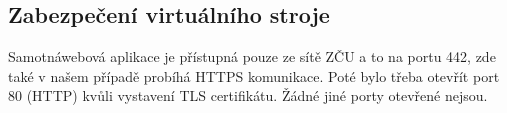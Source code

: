 \subsection{Zabezpečení virtuálního stroje}
Samotnáwebová aplikace je přístupná pouze ze sítě ZČU a to na portu 442, zde také v našem případě probíhá HTTPS komunikace.
Poté bylo třeba otevřít port 80 (HTTP) kvůli vystavení TLS certifikátu.
Žádné jiné porty otevřené nejsou.
